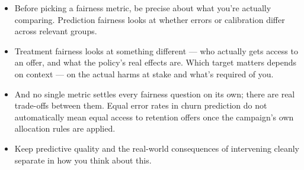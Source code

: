 \documentclass[11pt,a4paper]{article}
\begin{document}
\begin{examplebox}[title after break={SPOKEN SCRIPT --- slide 49 continued}]
\begin{itemize}
\item Before picking a fairness metric, be precise about what you're actually comparing. Prediction fairness looks at whether errors or calibration differ across relevant groups.
\item Treatment fairness looks at something different — who actually gets access to an offer, and what the policy's real effects are. Which target matters depends on context — on the actual harms at stake and what's required of you.
\item And no single metric settles every fairness question on its own; there are real trade-offs between them. Equal error rates in churn prediction do not automatically mean equal access to retention offers once the campaign's own allocation rules are applied.
\item Keep predictive quality and the real-world consequences of intervening cleanly separate in how you think about this.
\end{itemize}
\end{examplebox}
\par\noindent{\scriptsize\textcolor{teal!60!black}{Reading anchor: Bucaioni, published Table 1, pp. 6–7 · Bass, Ch. 14 · Bass, Ch. 10 / §14.2}}
\clearpage
\end{document}

